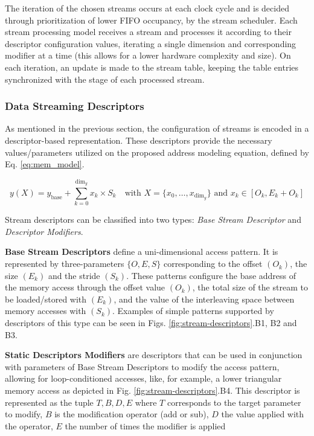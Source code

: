 The iteration of the chosen streams occurs at each clock cycle and is decided through prioritization of lower FIFO occupancy, by the stream scheduler. Each stream processing model receives a stream and processes it according to their descriptor configuration values, iterating a single dimension and corresponding modifier at a time (this allows for a lower hardware complexity and size).  On each iteration, an update is made to the stream table, keeping the table entries synchronized with the stage of each processed stream. 


\subsubsection{Data Streaming Descriptors}

As mentioned in the previous section, the configuration of streams is encoded in a descriptor-based representation. These descriptors provide the necessary values/parameters utilized on the proposed address modeling equation, defined by Eq. \ref{eq:mem_model}. 

\begin{equation}
    y(X) = y_{\text{base}} + \sum_{k=0}^{\text{dim}_y} x_k \times S_k
    \quad \text{with } X = \{x_0, \ldots, x_{\text{dim}_y}\} \text{ and } x_k \in [O_k, E_k+O_k]
    \label{eq:mem_model}
\end{equation}

Stream descriptors can be classified into two types: \textit{Base Stream Descriptor} and \textit{Descriptor Modifiers}.

\textbf{Base Stream Descriptors} define a uni-dimensional access pattern. It is represented by three-parameters $\{O, E, S\}$ corresponding to the offset $(O_k)$, the size $(E_k)$ and the stride $(S_k)$. These patterns configure the base address of the memory access through the offset value $(O_k)$, the total size of the stream to be loaded/stored with $(E_k)$, and the value of the interleaving space between memory accesses with $(S_k)$. Examples of simple patterns supported by descriptors of this type can be seen in Figs. \ref{fig:stream-descriptors}.B1, B2 and B3.

\textbf{Static Descriptors Modifiers} are descriptors that can be used in conjunction with parameters of Base Stream Descriptors to modify the access pattern, allowing for loop-conditioned accesses, like, for example, a lower triangular memory access as depicted in Fig. \ref{fig:stream-descriptors}.B4. This descriptor is represented as the tuple ${T, B, D, E}$ where $T$ corresponds to the target parameter to modify, $B$ is the modification operator (add or sub), $D$ the value applied with the operator, $E$ the number of times the modifier is applied 

